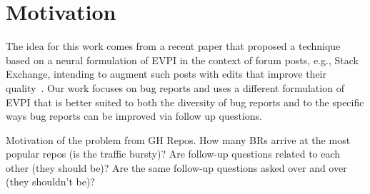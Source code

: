 \section{Motivation}

The idea for this work comes from a recent paper that proposed a technique based on a neural formulation of EVPI in the context of forum posts, e.g., Stack Exchange, intending to augment such posts with edits that improve their quality~\cite{rao-daume-iii-2018-learning}. Our work focuses on bug reports and uses a different formulation of EVPI that is better suited to both the diversity of bug reports and to the specific ways bug reports can be improved via follow up questions.


Motivation of the problem from GH Repos.
How many BRs arrive at the most popular repos (is the traffic bursty)?
Are  follow-up questions related to each other (they should be)? Are the same follow-up questions asked over and over (they shouldn’t be)?
